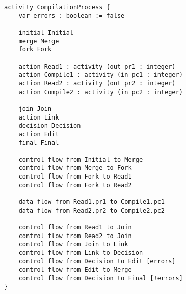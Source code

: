 \begin{lstlisting}[float,language=activity, caption={Gamma Activity Language representation of the compilation activity.}, label={lst:gamma-activity}, linewidth=0.80\textwidth, xleftmargin=0.20\textwidth]
activity CompilationProcess {
	var errors : boolean := false
	
	initial Initial
	merge Merge
	fork Fork
	
	action Read1 : activity (out pr1 : integer)
	action Compile1 : activity (in pc1 : integer)
	action Read2 : activity (out pr2 : integer)
	action Compile2 : activity (in pc2 : integer)
	
	join Join
	action Link
	decision Decision
	action Edit
	final Final
	
	control flow from Initial to Merge 
	control flow from Merge to Fork 
	control flow from Fork to Read1 
	control flow from Fork to Read2
	
	data flow from Read1.pr1 to Compile1.pc1
	data flow from Read2.pr2 to Compile2.pc2
	
	control flow from Read1 to Join 
	control flow from Read2 to Join
	control flow from Join to Link
	control flow from Link to Decision
	control flow from Decision to Edit [errors]
	control flow from Edit to Merge
	control flow from Decision to Final [!errors]
}
\end{lstlisting}